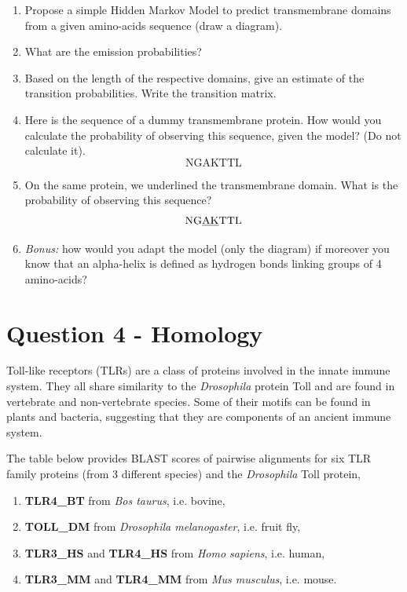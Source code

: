 \documentclass[a4paper,11pt]{article}
\begin{document}
\begin{enumerate}
\item Propose a simple Hidden Markov Model to predict transmembrane domains 
from a given amino-acids sequence (draw a diagram).
\item What are the emission probabilities?
\item Based on the length of the respective domains, give an estimate
  of the transition probabilities. Write the transition matrix.
\item Here is the sequence of a dummy transmembrane protein. How would
  you calculate the probability of observing this sequence, given the
  model? (Do not calculate it).
$$\mbox{NGAKTTL}$$

\item On the same protein, we underlined the transmembrane domain. 
What is the probability of observing this sequence? 
$$\mbox{NG\underline{AK}TTL}$$

\item \textit{Bonus:} how would you adapt the model (only the diagram)
  if moreover you know that an alpha-helix is defined as hydrogen
  bonds linking groups of 4 amino-acids?
\end{enumerate}

\section*{Question 4 - Homology}


Toll-like receptors (TLRs) are a class of proteins involved in the innate immune system. 
They all share similarity to the \textit{Drosophila} protein Toll and
are found in vertebrate and non-vertebrate species.  
Some of their motifs can be found in plants and bacteria, suggesting
that they are components of an ancient immune system. 

The table below provides BLAST scores of pairwise
alignments for six TLR family proteins (from 3 different species) and
the \textit{Drosophila} Toll protein,  

\begin{enumerate}
\item {\bf TLR4\_BT} from {\it Bos taurus}, i.e. bovine,
\item {\bf TOLL\_DM} from {\it Drosophila melanogaster}, i.e. fruit fly,
\item {\bf TLR3\_HS} and {\bf TLR4\_HS} from {\it Homo sapiens}, i.e. human,
\item {\bf TLR3\_MM} and  {\bf TLR4\_MM} from {\it Mus musculus}, i.e. mouse.
\end{enumerate}
\end{document}
